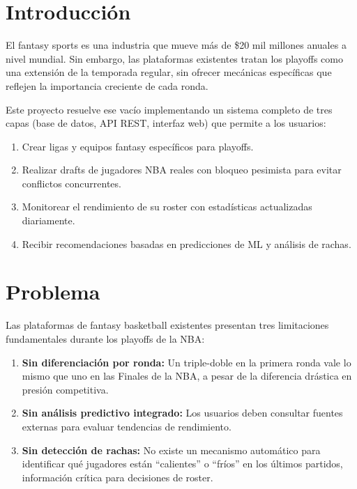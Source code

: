 \documentclass[12pt,a4paper]{article}
\begin{document}
\section{Introducci\'on}

El fantasy sports es una industria que mueve m\'as de \$20 mil millones anuales a nivel mundial.
Sin embargo, las plataformas existentes tratan los playoffs como una extensi\'on de la temporada regular,
sin ofrecer mec\'anicas espec\'ificas que reflejen la importancia creciente de cada ronda.

Este proyecto resuelve ese vac\'io implementando un sistema completo de tres capas (base de datos,
API REST, interfaz web) que permite a los usuarios:

\begin{enumerate}[nosep]
    \item Crear ligas y equipos fantasy espec\'ificos para playoffs.
    \item Realizar drafts de jugadores NBA reales con bloqueo pesimista para evitar conflictos concurrentes.
    \item Monitorear el rendimiento de su roster con estad\'isticas actualizadas diariamente.
    \item Recibir recomendaciones basadas en predicciones de ML y an\'alisis de rachas.
\end{enumerate}

\section{Problema}

Las plataformas de fantasy basketball existentes presentan tres limitaciones fundamentales
durante los playoffs de la NBA:

\begin{enumerate}
    \item \textbf{Sin diferenciaci\'on por ronda:} Un triple-doble en la primera ronda vale lo mismo
          que uno en las Finales de la NBA, a pesar de la diferencia dr\'astica en presi\'on competitiva.
    \item \textbf{Sin an\'alisis predictivo integrado:} Los usuarios deben consultar fuentes externas
          para evaluar tendencias de rendimiento.
    \item \textbf{Sin detecci\'on de rachas:} No existe un mecanismo autom\'atico para identificar
          qu\'e jugadores est\'an ``calientes'' o ``fr\'ios'' en los \'ultimos partidos, informaci\'on
          cr\'itica para decisiones de roster.
\end{enumerate}
\end{document}
